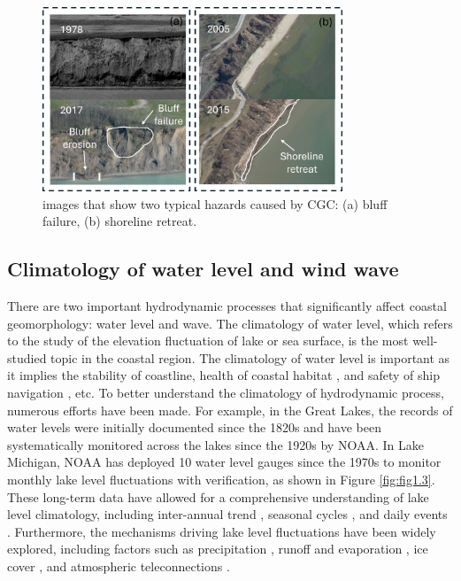 \begin{figure}[htbp]
  \centering
  \includegraphics[width=0.8\textwidth]{chapter1/resources/figure1-2.jpg}
  \caption{images that show two typical hazards caused by CGC: (a) bluff failure, (b) shoreline retreat.}
  \label{fig:fig1.2}
\end{figure}


\subsection{Climatology of water level and wind wave}
\label{subsec:Climatology of water level and wind wave}

There are two important hydrodynamic processes that significantly affect coastal
geomorphology: water level and wave. The climatology of water level, which
refers to the study of the elevation fluctuation of lake or sea surface, is the
most well-studied topic in the coastal region. The climatology of water level is
important as it implies the stability of coastline, health of coastal habitat
\citep{theuerkauf_rapid_2021}, and safety of ship navigation
\citep{posey2012climate}, etc. To better understand the climatology of
hydrodynamic process, numerous efforts have been made. For example, in the Great
Lakes, the records of water levels were initially documented since the 1820s
\citep{foster_report_1851} and have been systematically monitored across the
lakes since the 1920s by NOAA. In Lake Michigan, NOAA has deployed 10 water
level gauges since the 1970s to monitor monthly lake level fluctuations with
verification, as shown in Figure \ref{fig:fig1.3}. These long-term data have
allowed for a comprehensive understanding of lake level climatology, including
inter-annual trend \citep{hanrahan_attribution_2014,chen_understanding_2022},
seasonal cycles \citep{argyilan_lake_2003,quinn_secular_2002}, and daily events
\citep{trebitz_characterizing_2006}. Furthermore, the mechanisms driving lake
level fluctuations have been widely explored, including factors such as
precipitation \citep{rodionov_association_1994,hanrahan_attribution_2014},
runoff and evaporation
\citep{gronewold_tug--war_2021,gronewold_hydrological_2016,cheng_effects_2021},
ice cover \citep{farhadzadeh_study_2017}, and atmospheric teleconnections
\citep{ghanbari_coherence_2008}.

